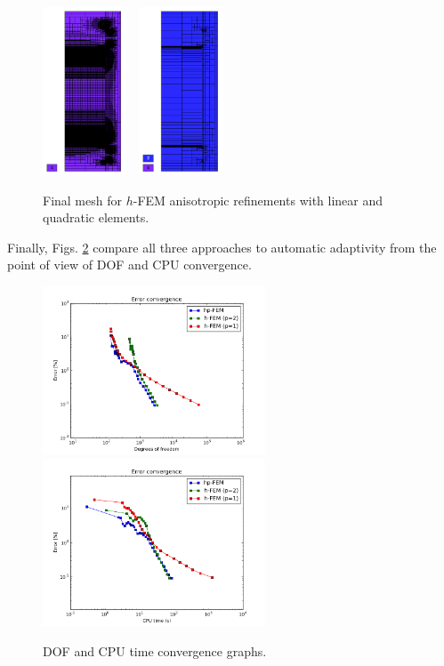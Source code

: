 \begin{figure}[!ht]
\centering
\includegraphics[height=5cm]{nist/nist-5/mesh_h1_aniso.png}\ \
\includegraphics[height=5cm]{nist/nist-5/mesh_h2_aniso.png}
\vspace{-2mm}
\caption{Final mesh for $h$-FEM anisotropic refinements with linear and quadratic elements.}
\label{fig:nist-5-h-aniso}
\end{figure}

Finally, Figs. \ref{fig:nist-5-conv} compare all
three approaches to automatic adaptivity from the point
of view of DOF and CPU convergence.

\begin{figure}[!ht]
\centering
\includegraphics[height=5cm]{nist/nist-5/conv_dof_aniso.png}\ \
\includegraphics[height=5cm]{nist/nist-5/conv_cpu_aniso.png}
\caption{DOF and CPU time convergence graphs.}
\label{fig:nist-5-conv}
\end{figure}

